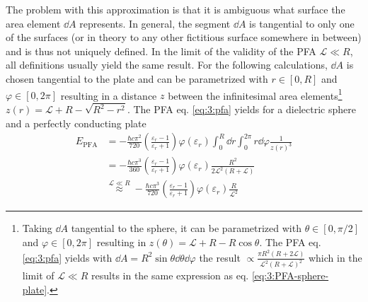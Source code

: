 The problem with this approximation is that it is ambiguous what surface the area element $\dd A$ represents. 
In general, the segment $\dd A$ is tangential to only one of the surfaces (or in theory to any other fictitious surface somewhere in between) \cite{Bulgac_2006} and is thus not uniquely defined.
In the limit of the validity of the PFA $\mathscr{L} \ll R$, all definitions usually yield the same result.
For the following calculations, $\dd A$ is chosen tangential to the plate and can be parametrized with $r\in [0, R]$ and $\varphi \in [0, 2\pi]$ resulting in a distance $z$ between the infinitesimal area elements\footnote{Taking $\dd A$ tangential to the sphere, it can be parametrized with $\theta \in [0, \pi/2]$ and $\varphi \in [0, 2\pi]$ resulting in $z(\theta) = \mathscr{L} + R - R\cos\theta$. The PFA eq. \eqref{eq:3:pfa} yields with $\dd A = R^2\sin\theta\dd\theta\dd\varphi$ the result $\propto \frac{\pi R^2(R + 2\mathscr{L})}{\mathscr{L}^2(R+\mathscr{L})^2}$ which in the limit of $\mathscr{L} \ll R$ results in the same expression as eq. \eqref{eq:3:PFA-sphere-plate}.} $z(r) = \mathscr{L} + R - \sqrt{R^2 - r^2}$. The PFA eq. \eqref{eq:3:pfa} yields for a dielectric sphere and a perfectly conducting plate
\begin{align}
  E_\mathrm{PFA} &= -\frac{\hbar c \pi^2}{720} \left(\frac{\varepsilon_r - 1}{\varepsilon_r + 1}\right) \varphi(\varepsilon_r) \int_0^R \dd r \int_0^{2\pi} r\dd \varphi \frac{1}{z(r)^3} \\
  &= -\frac{\hbar c \pi^3}{360} \left(\frac{\varepsilon_r - 1}{\varepsilon_r + 1}\right) \varphi(\varepsilon_r) \frac{R^2}{2\mathscr{L}^2(R + \mathscr{L})} \\
  &\overset{\mathscr{L}\ll R}{\approx} -\frac{\hbar c \pi^3}{720} \left(\frac{\varepsilon_r - 1}{\varepsilon_r + 1}\right) \varphi(\varepsilon_r) \frac{R}{\mathscr{L}^2} \label{eq:3:PFA-sphere-plate}
\end{align}
